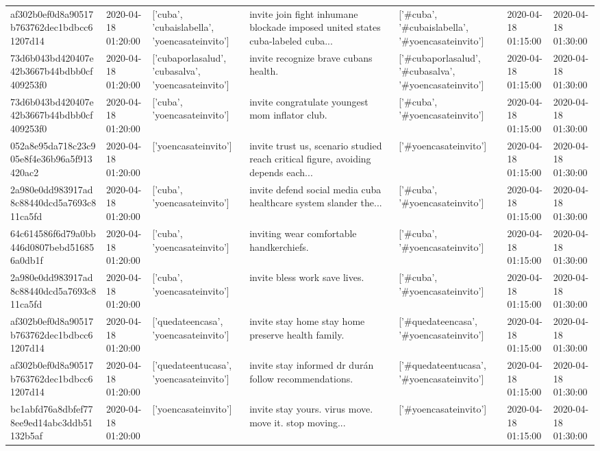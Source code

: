 \begin{tabular}{lllllll}
af302b0ef0d8a90517b763762dec1bdbcc61207d14 & 2020-04-18 01:20:00 & ['cuba', 'cubaislabella', 'yoencasateinvito'] & invite join fight inhumane blockade imposed united states cuba-labeled cuba... & ['#cuba', '#cubaislabella', '#yoencasateinvito'] & 2020-04-18 01:15:00 & 2020-04-18 01:30:00 \\
73d6b043bd420407e42b3667b44bdbb0cf409253f0 & 2020-04-18 01:20:00 & ['cubaporlasalud', 'cubasalva', 'yoencasateinvito'] & invite recognize brave cubans health. & ['#cubaporlasalud', '#cubasalva', '#yoencasateinvito'] & 2020-04-18 01:15:00 & 2020-04-18 01:30:00 \\
73d6b043bd420407e42b3667b44bdbb0cf409253f0 & 2020-04-18 01:20:00 & ['cuba', 'yoencasateinvito'] & invite congratulate youngest mom inflator club. & ['#cuba', '#yoencasateinvito'] & 2020-04-18 01:15:00 & 2020-04-18 01:30:00 \\
052a8e95da718c23c905e8f4e36b96a5f913420ac2 & 2020-04-18 01:20:00 & ['yoencasateinvito'] & invite trust us, scenario studied reach critical figure, avoiding depends each... & ['#yoencasateinvito'] & 2020-04-18 01:15:00 & 2020-04-18 01:30:00 \\
2a980e0dd983917ad8c88440dcd5a7693c811ca5fd & 2020-04-18 01:20:00 & ['cuba', 'yoencasateinvito'] & invite defend social media cuba healthcare system slander the... & ['#cuba', '#yoencasateinvito'] & 2020-04-18 01:15:00 & 2020-04-18 01:30:00 \\
64c614586f6d79a0bb446d0807bebd516856a0db1f & 2020-04-18 01:20:00 & ['cuba', 'yoencasateinvito'] & inviting wear comfortable handkerchiefs. & ['#cuba', '#yoencasateinvito'] & 2020-04-18 01:15:00 & 2020-04-18 01:30:00 \\
2a980e0dd983917ad8c88440dcd5a7693c811ca5fd & 2020-04-18 01:20:00 & ['cuba', 'yoencasateinvito'] & invite bless work save lives. & ['#cuba', '#yoencasateinvito'] & 2020-04-18 01:15:00 & 2020-04-18 01:30:00 \\
af302b0ef0d8a90517b763762dec1bdbcc61207d14 & 2020-04-18 01:20:00 & ['quedateencasa', 'yoencasateinvito'] & invite stay home stay home preserve health family. & ['#quedateencasa', '#yoencasateinvito'] & 2020-04-18 01:15:00 & 2020-04-18 01:30:00 \\
af302b0ef0d8a90517b763762dec1bdbcc61207d14 & 2020-04-18 01:20:00 & ['quedateentucasa', 'yoencasateinvito'] & invite stay informed dr durán follow recommendations. & ['#quedateentucasa', '#yoencasateinvito'] & 2020-04-18 01:15:00 & 2020-04-18 01:30:00 \\
bc1abfd76a8dbfef778ee9ed14abc3ddb51132b5af & 2020-04-18 01:20:00 & ['yoencasateinvito'] & invite stay yours. virus move. move it. stop moving... & ['#yoencasateinvito'] & 2020-04-18 01:15:00 & 2020-04-18 01:30:00 \\

\end{tabular}
